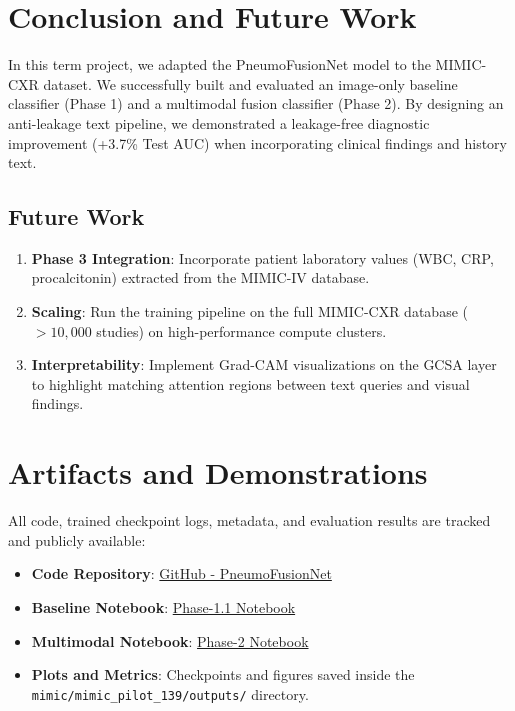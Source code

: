 \documentclass[11pt,a4paper]{article}
\begin{document}
\section{Conclusion and Future Work} \label{sec:conclusion}
In this term project, we adapted the PneumoFusionNet model to the MIMIC-CXR dataset. We successfully built and evaluated an image-only baseline classifier (Phase 1) and a multimodal fusion classifier (Phase 2). By designing an anti-leakage text pipeline, we demonstrated a leakage-free diagnostic improvement (+3.7\% Test AUC) when incorporating clinical findings and history text.

\subsection{Future Work}
\begin{enumerate}
    \item \textbf{Phase 3 Integration}: Incorporate patient laboratory values (WBC, CRP, procalcitonin) extracted from the MIMIC-IV database.
    \item \textbf{Scaling}: Run the training pipeline on the full MIMIC-CXR database ($>10,000$ studies) on high-performance compute clusters.
    \item \textbf{Interpretability}: Implement Grad-CAM visualizations on the GCSA layer to highlight matching attention regions between text queries and visual findings.
\end{enumerate}

\section{Artifacts and Demonstrations} \label{sec:artifacts}
All code, trained checkpoint logs, metadata, and evaluation results are tracked and publicly available:
\begin{itemize}
    \item \textbf{Code Repository}: \href{https://github.com/Ashutosh-yadav0001/PneumoFusionNet}{GitHub - PneumoFusionNet}
    \item \textbf{Baseline Notebook}: \href{file:///C:/2026/PneumoFusionNet/mimic/mimic_pilot_139/Notebooks/Phase-1.1mimic_image_classifier(balanced-Set).ipynb}{Phase-1.1 Notebook}
    \item \textbf{Multimodal Notebook}: \href{file:///C:/2026/PneumoFusionNet/mimic/mimic_pilot_139/Notebooks/Phase-2_multimodal_fusion.ipynb}{Phase-2 Notebook}
    \item \textbf{Plots and Metrics}: Checkpoints and figures saved inside the \texttt{mimic/mimic\_pilot\_139/outputs/} directory.
\end{itemize}
\end{document}
